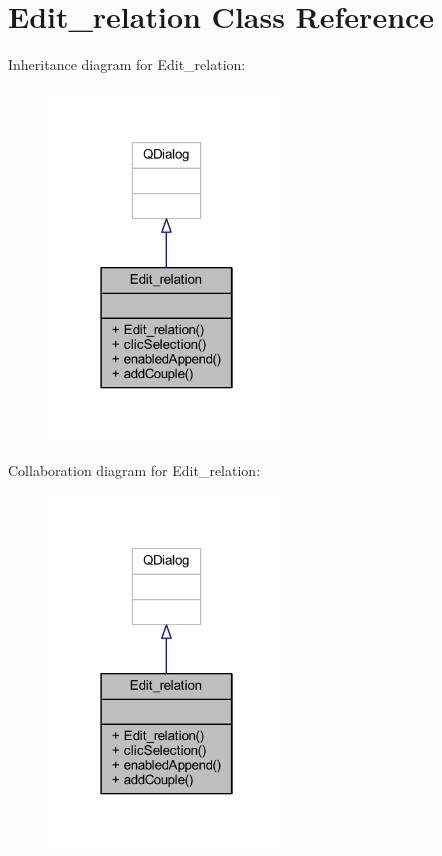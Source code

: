 \hypertarget{class_edit__relation}{}\section{Edit\+\_\+relation Class Reference}
\label{class_edit__relation}


Inheritance diagram for Edit\+\_\+relation\+:
\nopagebreak
\begin{figure}[H]
\begin{center}
\leavevmode
\includegraphics[width=178pt]{class_edit__relation__inherit__graph}
\end{center}
\end{figure}


Collaboration diagram for Edit\+\_\+relation\+:
\nopagebreak
\begin{figure}[H]
\begin{center}
\leavevmode
\includegraphics[width=178pt]{class_edit__relation__coll__graph}
\end{center}
\end{figure}
